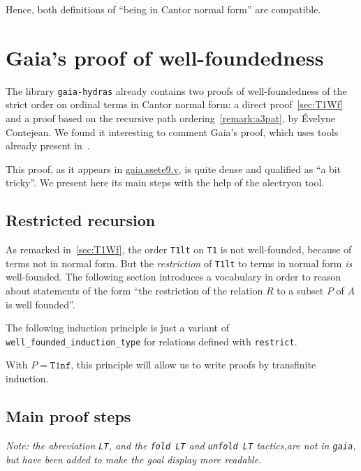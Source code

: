 

Hence, both definitions of ``being in Cantor normal form'' are
compatible.



\section{Gaia's proof of well-foundedness}
The library \texttt{gaia-hydras} already contains two proofs
of well-foundedness of the strict order on ordinal terms in
Cantor normal form: a direct proof~\vref{sec:T1Wf} and a proof based on the recursive path ordering~\vref{remark:a3pat}, by
\'Evelyne Contejean. We found it interesting to comment Gaia's proof, which uses tools already present in~\cite{CantorContrib}.

This proof, as it appears in \href{https://github.com/coq-community/gaia/blob/master/theories/ssete9.v}{gaia.ssete9.v}, is quite dense and qualified as ``a bit tricky''. We present here its main steps with the help of the alectryon tool.


\subsection{Restricted recursion}
As remarked in~\vref{sec:T1Wf}, the order \texttt{T1lt} on \texttt{T1} is not well-founded, because of terms not in normal form.
But the \emph{restriction} of \texttt{T1lt} to terms in normal form \emph{is} well-founded. The following section introduces a  vocabulary in order to reason about statements of the form  ``the restriction of the relation $R$ to a subset $P$ of $A$ is well founded''.


The following induction principle is just a variant of \texttt{well\_founded\_induction\_type} for relations defined with \texttt{restrict}.


With $P=\texttt{T1nf}$, this principle will allow us to write proofs by transfinite induction.

\subsection{Main proof steps}

\emph{Note: the abreviation \texttt{LT}, and the \texttt{fold LT} and \texttt{unfold LT} tactics,are not in \texttt{gaia}, but  have been added to make the goal display more readable.}

